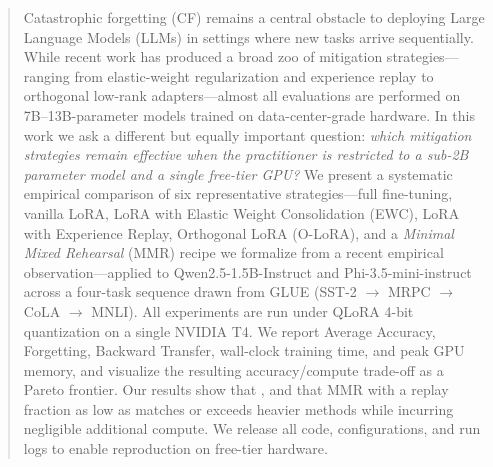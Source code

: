 \begin{abstract}
Catastrophic forgetting (CF) remains a central obstacle to deploying
Large Language Models (LLMs) in settings where new tasks arrive
sequentially. While recent work has produced a broad zoo of
mitigation strategies---ranging from elastic-weight regularization
and experience replay to orthogonal low-rank adapters---almost all
evaluations are performed on 7B--13B-parameter models trained on
data-center-grade hardware. In this work we ask a different but
equally important question: \emph{which mitigation strategies remain
effective when the practitioner is restricted to a sub-2B parameter
model and a single free-tier GPU?} We present a systematic empirical
comparison of six representative strategies---full fine-tuning,
vanilla LoRA, LoRA with Elastic Weight Consolidation (EWC),
LoRA with Experience Replay, Orthogonal LoRA (O-LoRA), and a
\emph{Minimal Mixed Rehearsal} (MMR) recipe we formalize from a
recent empirical observation---applied to Qwen2.5-1.5B-Instruct and
Phi-3.5-mini-instruct across a four-task sequence drawn from GLUE
(SST-2 $\rightarrow$ MRPC $\rightarrow$ CoLA $\rightarrow$ MNLI).
All experiments are run under QLoRA 4-bit quantization on a single
NVIDIA T4. We report Average Accuracy, Forgetting, Backward Transfer,
wall-clock training time, and peak GPU memory, and visualize the
resulting accuracy/compute trade-off as a Pareto frontier.
Our results show that , and that MMR with a replay fraction as low as
 matches or exceeds heavier methods while incurring
negligible additional compute. We release all code, configurations,
and run logs to enable reproduction on free-tier hardware.
\end{abstract}
